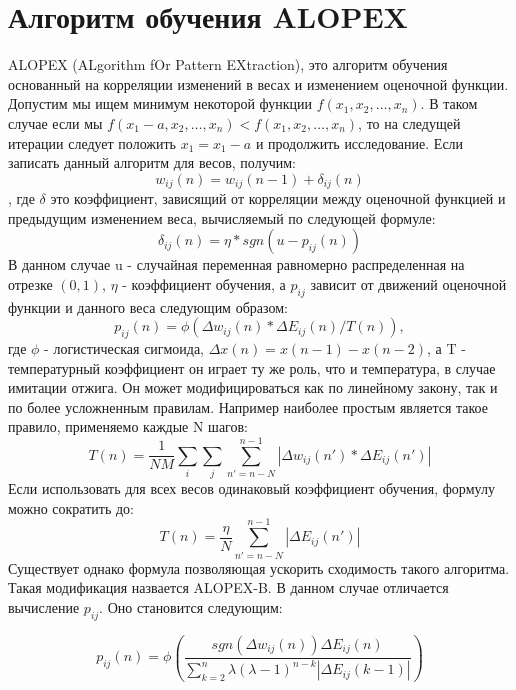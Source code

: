 \documentclass[utf8,usehyperref,14pt]{G7-32}
\begin{document}
\section{Алгоритм обучения ALOPEX}
ALOPEX (ALgorithm fOr Pattern EXtraction), это алгоритм обучения основанный на корреляции изменений в весах и изменением оценочной функции. Допустим мы ищем минимум некоторой функции $ f(x_{1}, x_{2}, … ,x_{n}) $. В таком случае если мы $ f(x_{1}-a, x_{2}, … ,x_{n}) <  f(x_{1}, x_{2}, … ,x_{n}) $, то на следущей итерации следует положить $ x_{1} = x_{1}-a $ и продолжить исследование. Если записать данный алгоритм для весов, получим:
\begin{equation}
w_{ij}(n) = w_{ij}(n-1) + \delta_{ij}(n)
\label{main_alopex}
\end{equation}
, где $ \delta $ это коэффициент, зависящий от корреляции между оценочной функцией и предыдущим изменением веса, вычисляемый по следующей формуле:
\begin{equation}
\delta_{ij}(n) = \eta * sgn(u - p_{ij}(n)) 
\end{equation}
В данном случае u - случайная переменная равномерно распределенная на отрезке $ (0, 1) $, $\eta$ - коэффициент обучения, а $ p_{ij} $ зависит от движений оценочной функции и данного веса следующим образом:
\begin{equation}
p_{ij}(n) = \phi (\Delta w_{ij}(n) * \Delta E_{ij}(n) / T(n)), 
\end{equation}
где $ \phi $ - логистическая сигмоида, $ \Delta x(n) = x(n-1) - x(n-2) $, а T - температурный коэффициент он играет ту же роль, что и температура, в случае имитации отжига. Он может модифицироваться как по линейному закону, так и по более усложненным правилам. Например наиболее простым является такое правило, применяемо каждые N шагов:
\begin{equation}
T(n) = \frac{1}{NM} \sum_i \sum_j \sum_{n'=n-N}^{n-1} |\Delta w_{ij}(n') * \Delta E_{ij}(n')|
\label{alopex_annealing}
\end{equation}
Если использовать для всех весов одинаковый коэффициент обучения, формулу можно сократить до:
\begin{equation}
T(n) = \frac{\eta}{N} \sum_{n'=n-N}^{n-1} |\Delta E_{ij}(n')|
\end{equation}
Существует однако формула позволяющая ускорить сходимость такого алгоритма. Такая модификация назвается ALOPEX-B\cite{carlo_alopex}. В данном случае отличается  вычисление $ p_{ij}$. Оно становится следующим:

\begin{equation}
p_{ij}(n) =\phi ( \frac{sgn(\Delta w_{ij}(n)) \Delta E_{ij}(n)}{\sum_{k=2}^{n} \lambda (\lambda-1)^{n-k}|\Delta E_{ij}(k-1)|})
\end{equation}
\end{document}
